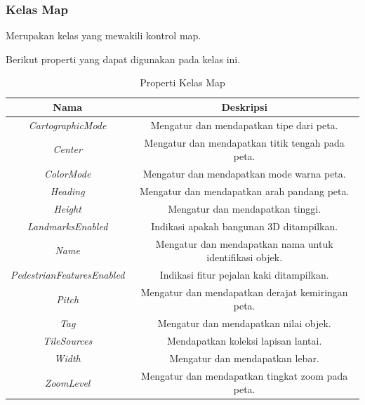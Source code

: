 \subsubsection{Kelas Map}
\label{subsubsec:Kelas Map}
\hspace{0.5cm} Merupakan kelas yang mewakili kontrol map.

Berikut properti yang dapat digunakan pada kelas ini.
\begin{table}[h]
	\centering
		\begin{tabular}{ |c|c|}
				\hline
					Nama & Deskripsi \\ \hline
					\textit{CartographicMode} & Mengatur dan mendapatkan tipe dari peta. \\ \hline
					\textit{Center} & Mengatur dan mendapatkan titik tengah pada peta. \\ \hline
					\textit{ColorMode} & Mengatur dan mendapatkan mode warna peta. \\ \hline
					\textit{Heading} & Mengatur dan mendapatkan arah pandang peta. \\ \hline
					\textit{Height} & Mengatur dan mendapatkan tinggi. \\ \hline
					\textit{LandmarksEnabled} & Indikasi apakah bangunan 3D ditampilkan. \\ \hline
					\textit{Name} & Mengatur dan mendapatkan nama untuk identifikasi objek. \\ \hline
					\textit{PedestrianFeaturesEnabled} & Indikasi fitur pejalan kaki ditampilkan. \\ \hline
					\textit{Pitch} & Mengatur dan mendapatkan derajat kemiringan peta. \\ \hline
					\textit{Tag} & Mengatur dan mendapatkan nilai objek. \\ \hline
					\textit{TileSources} & Mendapatkan koleksi lapisan lantai. \\ \hline
					\textit{Width} & Mengatur dan mendapatkan lebar. \\ \hline
					\textit{ZoomLevel} & Mengatur dan mendapatkan tingkat zoom pada peta. \\ \hline
				\hline
		\end{tabular}
	\caption{Properti Kelas Map}
	\label{tab:PropertiKelasMap}
\end{table}

